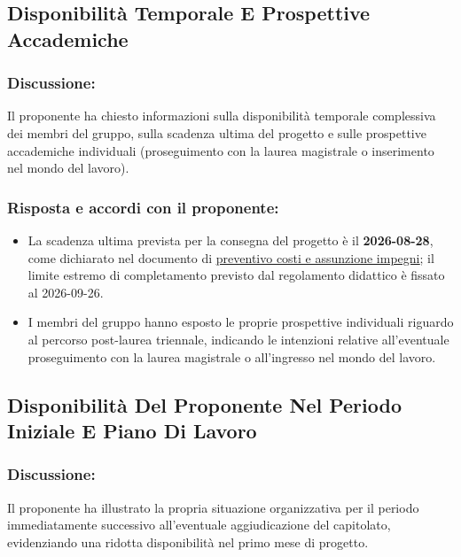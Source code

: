 \subsection{Disponibilità Temporale E Prospettive Accademiche}
 
\subsubsection*{Discussione:}
Il proponente ha chiesto informazioni sulla disponibilità temporale complessiva
dei membri del gruppo, sulla scadenza ultima del progetto e sulle prospettive
accademiche individuali (proseguimento con la laurea magistrale o inserimento
nel mondo del lavoro).
 
\subsubsection*{Risposta e accordi con il proponente:}
 
\begin{itemize}
    \item La scadenza ultima prevista per la consegna del progetto è il
      \textbf{2026-08-28}, come dichiarato nel documento di
      \href{https://synergo-unit-unipd.github.io/Documentary-Repo/docs/CC/doc_gestionali/doc_esterni/preventivo_costi_assunzione_impegni/preventivo_costi_e_assunzione_impegni.pdf}
      {\underline{preventivo costi e assunzione impegni}};
      il limite estremo di completamento previsto dal regolamento didattico
      è fissato al 2026-09-26.
    \item I membri del gruppo hanno esposto le proprie prospettive individuali
          riguardo al percorso post-laurea triennale, indicando le intenzioni
          relative all'eventuale proseguimento con la laurea magistrale o
          all'ingresso nel mondo del lavoro.
\end{itemize}
 
\subsection{Disponibilità Del Proponente Nel Periodo Iniziale E Piano Di Lavoro}
 
\subsubsection*{Discussione:}
Il proponente ha illustrato la propria situazione organizzativa per il periodo
immediatamente successivo all'eventuale aggiudicazione del capitolato,
evidenziando una ridotta disponibilità nel primo mese di progetto.
 
